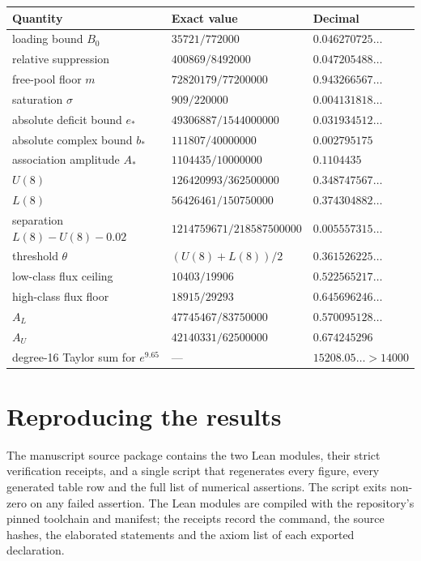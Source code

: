 \documentclass[11pt]{article}
\theoremstyle{definition}
\theoremstyle{remark}
\begin{document}
\begin{center}\small
\begin{tabular}{lll}
\toprule
Quantity & Exact value & Decimal\\
\midrule
loading bound $B_0$ & $35721/772000$ & $0.046270725\ldots$\\
relative suppression & $400869/8492000$ & $0.047205488\ldots$\\
free-pool floor $m$ & $72820179/77200000$ & $0.943266567\ldots$\\
saturation $\sigma$ & $909/220000$ & $0.004131818\ldots$\\
absolute deficit bound $e_*$ & $49306887/1544000000$ & $0.031934512\ldots$\\
absolute complex bound $b_*$ & $111807/40000000$ & $0.002795175$\\
association amplitude $A_*$ & $1104435/10000000$ & $0.1104435$\\
$U(8)$ & $126420993/362500000$ & $0.348747567\ldots$\\
$L(8)$ & $56426461/150750000$ & $0.374304882\ldots$\\
separation $L(8)-U(8)-0.02$ & $1214759671/218587500000$ & $0.005557315\ldots$\\
threshold $\theta$ & $(U(8)+L(8))/2$ & $0.361526225\ldots$\\
low-class flux ceiling & $10403/19906$ & $0.522565217\ldots$\\
high-class flux floor & $18915/29293$ & $0.645696246\ldots$\\
$A_L$ & $47745467/83750000$ & $0.570095128\ldots$\\
$A_U$ & $42140331/62500000$ & $0.674245296$\\
degree-16 Taylor sum for $e^{9.65}$ & --- & $15208.05\ldots>14000$\\
\bottomrule
\end{tabular}
\end{center}

\section{Reproducing the results}
\label{app:repro}

The manuscript source package contains the two Lean modules, their strict
verification receipts, and a single script that regenerates every figure,
every generated table row and the full list of numerical assertions. The script
exits non-zero on any failed assertion. The Lean modules are compiled with the
repository's pinned toolchain and manifest; the receipts record the command,
the source hashes, the elaborated statements and the axiom list of each
exported declaration.



\end{document}
